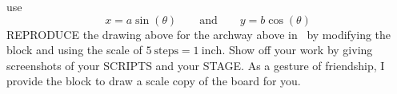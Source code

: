 \documentclass[noauthor,nooutcomes,hints,handout]{ximera}
\begin{document}
\begin{question}
\begin{enumerate}
\begin{center}
      \end{center}
    use
    \[
    x = a\sin(\theta) \qquad\text{and} \qquad y= b\cos(\theta)
    \]
    REPRODUCE the drawing above for the archway above in \snap\ by
    modifying the block
     and using
    the scale of $5~\text{steps} = 1~\text{inch}$.  Show off your work
    by giving screenshots of your SCRIPTS and your STAGE.  As a
    gesture of friendship, I provide the block
     to draw a scale copy of the board for
    you.
 

\end{enumerate}
\end{question}
\end{document}
